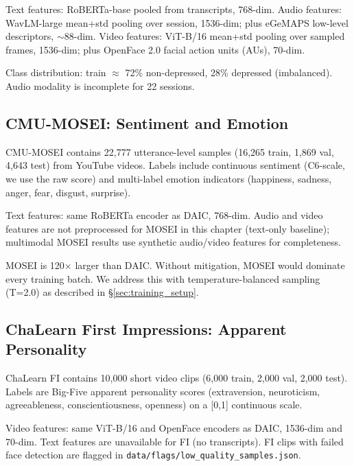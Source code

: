 \documentclass[12pt,oneside]{book}
\begin{document}
Text features: RoBERTa-base \citep{liu2019roberta} pooled from transcripts, 768-dim. Audio features: WavLM-large \citep{chen2022wavlm} mean+std pooling over session, 1536-dim; plus eGeMAPS \citep{eyben2016geneva} low-level descriptors, $\sim$88-dim. Video features: ViT-B/16 \citep{dosovitskiy2020image} mean+std pooling over sampled frames, 1536-dim; plus OpenFace 2.0 \citep{baltrusaitis2018openface} facial action units (AUs), 70-dim.

Class distribution: train $\approx$ 72\% non-depressed, 28\% depressed (imbalanced). Audio modality is incomplete for 22 sessions.

\subsection{CMU-MOSEI: Sentiment and Emotion}
\label{sec:mosei}

CMU-MOSEI \citep{zadeh2018multimodal} contains 22,777 utterance-level samples (16,265 train, 1,869 val, 4,643 test) from YouTube videos. Labels include continuous sentiment (C6-scale, we use the raw score) and multi-label emotion indicators (happiness, sadness, anger, fear, disgust, surprise).

Text features: same RoBERTa encoder as DAIC, 768-dim. Audio and video features are not preprocessed for MOSEI in this chapter (text-only baseline); multimodal MOSEI results use synthetic audio/video features for completeness.

MOSEI is 120$\times$ larger than DAIC. Without mitigation, MOSEI would dominate every training batch. We address this with temperature-balanced sampling (T=2.0) as described in \S\ref{sec:training_setup}.

\subsection{ChaLearn First Impressions: Apparent Personality}
\label{sec:fi}

ChaLearn FI \citep{escalante2020chalearn} contains 10,000 short video clips (6,000 train, 2,000 val, 2,000 test). Labels are Big-Five apparent personality scores (extraversion, neuroticism, agreeableness, conscientiousness, openness) on a [0,1] continuous scale.

Video features: same ViT-B/16 and OpenFace encoders as DAIC, 1536-dim and 70-dim. Text features are unavailable for FI (no transcripts). FI clips with failed face detection are flagged in \texttt{data/flags/low\_quality\_samples.json}.
\end{document}
